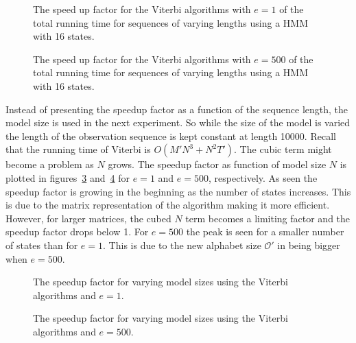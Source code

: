 \begin{figure}
  \centering
  
  \caption{The speed up factor for the Viterbi algorithms with $e = 1$ of the
    total running time for sequences of varying lengths using a HMM with 16
    states.}
  \label{fig:compressed_1_speedup_vs_sequence_length}
\end{figure}

\begin{figure}
  \centering
  
  \caption{The speed up factor for the Viterbi algorithms with $e = 500$ of the
    total running time for sequences of varying lengths using a HMM with 16
    states.}
  \label{fig:compressed_500_speedup_vs_sequence_length}
\end{figure}

Instead of presenting the speedup factor as a function of the sequence length,
the model size is used in the next experiment. So while the size of the model
is varied the length of the observation sequence is kept constant at length
10000. Recall that the running time of Viterbi is $O(M' N^3 + N^2 T')$. The
cubic term might become a problem as $N$ grows. The speedup factor as function
of model size $N$ is plotted in figures~\ref{fig:speedup_vs_N}
and~\ref{fig:speedup_vs_N2} for $e = 1$ and $e = 500$,
respectively. As seen the speedup factor is growing in the beginning as the
number of states increases. This is due to the matrix representation
of the algorithm making it more efficient. However, for larger matrices, the
cubed $N$ term becomes a limiting factor and the speedup factor drops below 1.
For $e = 500$ the peak is seen for a smaller number of states
than for $e = 1$. This is due to the new alphabet size
$\mathcal{O'}$ in being bigger when $e = 500$. 

\begin{figure}
  \centering
  
  \caption{The speedup factor for varying model sizes using the Viterbi
    algorithms and $e = 1$.}
  \label{fig:speedup_vs_N}
\end{figure}

\begin{figure}
  \centering
  
  \caption{The speedup factor for varying model sizes using the Viterbi
    algorithms and $e=500$.}
  \label{fig:speedup_vs_N2}
\end{figure}


